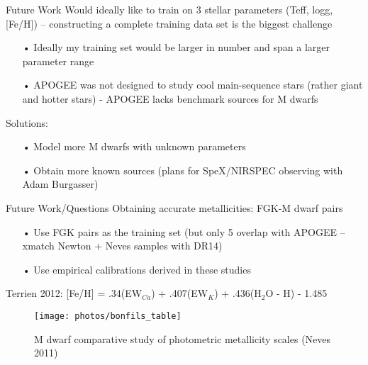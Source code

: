 \documentclass[compress]{beamer}
\begin{document}
\begin{frame}{Future Work} \large
Would ideally like to train on 3 stellar parameters (Teff, logg, [Fe/H]) -- constructing a complete training data set is the biggest challenge
\begin{enumerate} \normalsize
	\item[•] Ideally my training set would be larger in number and span a larger parameter range
	\item[•] APOGEE was not designed to study cool main-sequence stars (rather giant and hotter stars) - APOGEE lacks benchmark sources for M dwarfs
\end{enumerate}

\pause
Solutions:
\begin{enumerate} \normalsize
	\item[•] Model more M dwarfs with unknown parameters
	\item[•] Obtain more known sources (plans for SpeX/NIRSPEC observing with Adam Burgasser)
\end{enumerate}
\end{frame}


\begin{frame}{Future Work/Questions} \large
Obtaining accurate metallicities: \textcolor{sthlmDarkGreen}{FGK-M dwarf pairs}
\begin{enumerate} \normalsize
	\item[•] Use FGK pairs as the training set (but only 5 overlap with APOGEE -- xmatch Newton + Neves samples with DR14)
	\pause
	\item[•] Use empirical calibrations derived in these studies
\end{enumerate}
\small
Terrien 2012: [Fe/H] = .34(EW$_{Ca}$) + .407(EW$_{K}$) + .436(H$_{2}$O - H) - 1.485
\begin{figure}
	\texttt{[image: photos/bonfils\_table]}
	\caption{M dwarf comparative study of photometric metallicity scales (Neves 2011)}   
\end{figure}
\end{frame}
\end{document}
